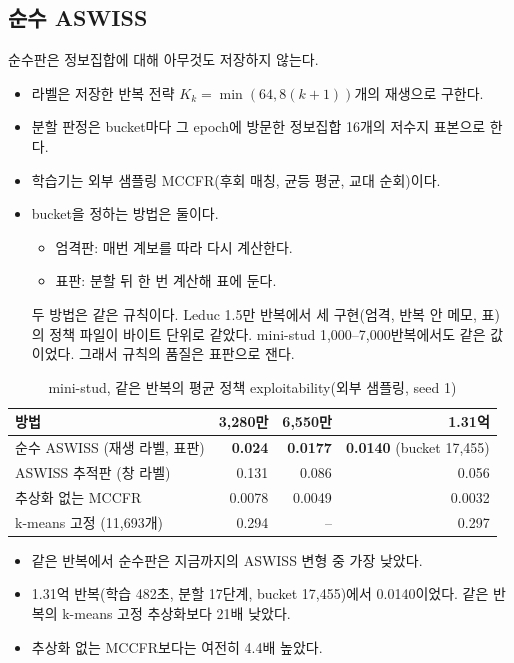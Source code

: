 \subsection{순수 ASWISS}\label{sec:exp-pure}
순수판은 정보집합에 대해 아무것도 저장하지 않는다.
\begin{itemize}
  \item 라벨은 저장한 반복 전략 $K_k=\min(64,8(k+1))$개의 재생으로 구한다.
  \item 분할 판정은 bucket마다 그 epoch에 방문한 정보집합 16개의 저수지 표본으로 한다.
  \item 학습기는 외부 샘플링 MCCFR(후회 매칭, 균등 평균, 교대 순회)이다.
  \item bucket을 정하는 방법은 둘이다.
    \begin{itemize}
      \item 엄격판: 매번 계보를 따라 다시 계산한다.
      \item 표판: 분할 뒤 한 번 계산해 표에 둔다.
    \end{itemize}
    두 방법은 같은 규칙이다. Leduc 1.5만 반복에서 세 구현(엄격, 반복 안 메모, 표)의 정책 파일이 바이트 단위로 같았다. mini-stud 1,000–7,000반복에서도 같은 값이었다. 그래서 규칙의 품질은 표판으로 잰다.
\end{itemize}

\begin{table}[h]
\centering\small
\caption{mini-stud, 같은 반복의 평균 정책 exploitability(외부 샘플링, seed 1)}\label{tab:pure}
\begin{tabular}{@{}lrrr@{}}
\toprule
방법 & 3,280만 & 6,550만 & 1.31억 \\
\midrule
순수 ASWISS (재생 라벨, 표판) & \textbf{0.024} & \textbf{0.0177} & \textbf{0.0140} (bucket 17,455) \\
ASWISS 추적판 (창 라벨) & 0.131 & 0.086 & 0.056 \\
추상화 없는 MCCFR & 0.0078 & 0.0049 & 0.0032 \\
k-means 고정 (11,693개) & 0.294 & – & 0.297 \\
\bottomrule
\end{tabular}
\end{table}
\begin{itemize}
  \item 같은 반복에서 순수판은 지금까지의 ASWISS 변형 중 가장 낮았다.
  \item 1.31억 반복(학습 482초, 분할 17단계, bucket 17,455)에서 0.0140이었다. 같은 반복의 k-means 고정 추상화보다 21배 낮았다.
  \item 추상화 없는 MCCFR보다는 여전히 4.4배 높았다.
\end{itemize}

